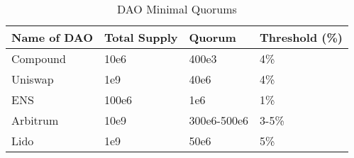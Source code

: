 \begin{table}[ht]
    \centering
    \caption{DAO Minimal Quorums}
    \label{table:dao-metrics}
    \begin{tabular}{|l|l|l|l|}
    \hline
    \textbf{Name of DAO} & \textbf{Total Supply} & \textbf{Quorum} & \textbf{Threshold (\%)} \\ \hline
    Compound             & 10e6            & 400e3             & 4\%                     \\ \hline
    Uniswap              & 1e9             & 40e6              & 4\%                     \\ \hline
    ENS                  & 100e6           & 1e6               & 1\%                     \\ \hline
    Arbitrum             & 10e9            & 300e6-500e6       & 3-5\%                   \\ \hline
    Lido                 & 1e9             & 50e6              & 5\%                     \\ \hline
    \end{tabular}
    \end{table}